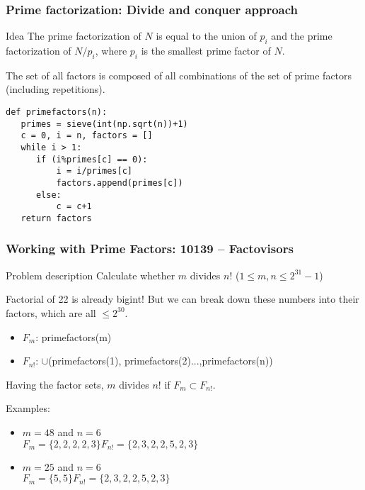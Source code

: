 \documentclass{beamer}
\begin{document}
\begin{frame}
  \frametitle{Prime factorization: Divide and conquer approach}
  
  {\smaller
  \begin{block}{Idea}
    The prime factorization of $N$ is equal to the union of $p_i$ and
    the prime factorization of $N/p_i$, where $p_i$ is the smallest
    prime factor of $N$.

    \bigskip

    The set of all factors is composed of all combinations of the set
    of prime factors (including repetitions).  
  \end{block}

  \begin{exampleblock}{}
\begin{verbatim}
def primefactors(n):
   primes = sieve(int(np.sqrt(n))+1)
   c = 0, i = n, factors = []
   while i > 1:
      if (i%primes[c] == 0):
          i = i/primes[c]
          factors.append(primes[c])
      else:
          c = c+1
   return factors
\end{verbatim}
  \end{exampleblock}}
\end{frame}


\begin{frame}
  \frametitle{Working with Prime Factors: 10139 -- Factovisors}

  {\smaller
    \begin{block}{Problem description}
      Calculate whether $m$ divides $n!$ ($1 \leq m,n \leq 2^{31}-1$)
    \end{block}

    Factorial of 22 is already bigint! But we can break down these numbers into their 
    factors, which are all $\leq 2^{30}$.

    \begin{itemize}
    \item $F_m$: primefactors(m)
    \item $F_{n!}$: $\cup$(primefactors(1), primefactors(2)...,primefactors(n))
    \end{itemize}

    Having the factor sets, $m$ divides $n!$ if $F_m \subset F_{n!}$.

    \bigskip

    Examples:
    \begin{itemize}
    \item $m = 48$ and $n=6$\\
      $F_m = \{2,2,2,2,3\} F_{n!} = \{2,3,2,2,5,2,3\}$
  
  \medskip

    \item $m = 25$ and $n = 6$\\
      $F_m = \{5,5\} F_{n!} = \{2,3,2,2,5,2,3\}$

    \end{itemize}
  }
\end{frame}
\end{document}
